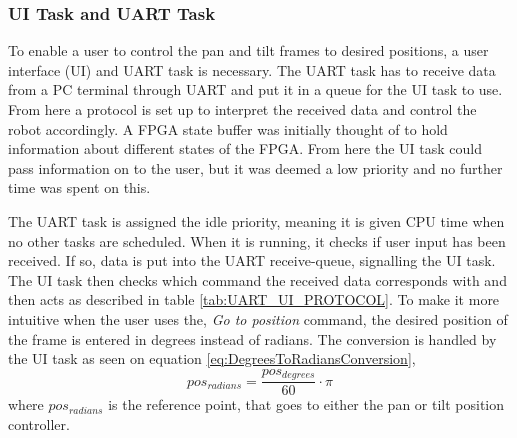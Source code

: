 \documentclass[../../main.tex]{subfiles}
\begin{document}





\subsubsection*{UI Task and UART Task}

To enable a user to control the pan and tilt frames to desired positions, a user interface (UI) and UART task is necessary. The UART task has to receive data from a PC terminal through UART and put it in a queue for the UI task to use. From here a protocol is set up to interpret the received data and control the robot accordingly. A FPGA state buffer was initially thought of to hold information about different states of the FPGA. From here the UI task could pass information on to the user, but it was deemed a low priority and no further time was spent on this.

The UART task is assigned the idle priority, meaning it is given CPU time when no other tasks are scheduled. When it is running, it checks if user input has been received. If so, data is put into the UART receive-queue, signalling the UI task. The UI task then checks which command the received data corresponds with and then acts as described in table \ref{tab:UART_UI_PROTOCOL}. To make it more intuitive when the user uses the, \textit{Go to position} command, the desired position of the frame is entered in degrees instead of radians. The conversion is handled by the UI task as seen on equation \ref{eq:DegreesToRadiansConversion},
\begin{equation} \label{eq:DegreesToRadiansConversion}
    pos_{radians} = \frac{pos_{degrees}}{60}\cdot \pi
\end{equation}
where $pos_{radians}$ is the reference point, that goes to either the pan or tilt position controller.
\end{document}
